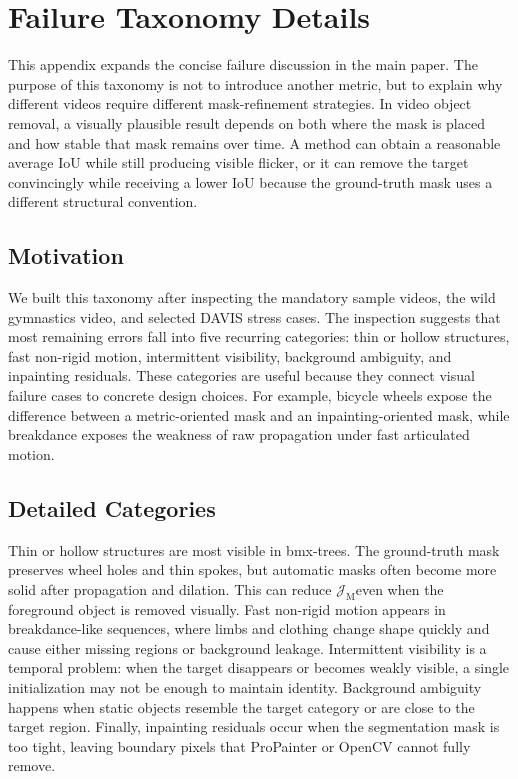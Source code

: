 \documentclass[10pt,twocolumn,letterpaper]{article}
\newcommand{\jm}{\ensuremath{\mathcal{J}_{\mathrm{M}}}}
\begin{document}
\section{Failure Taxonomy Details}
\label{app:failure_taxonomy}
This appendix expands the concise failure discussion in the main paper. The purpose of this taxonomy is not to introduce another metric, but to explain why different videos require different mask-refinement strategies. In video object removal, a visually plausible result depends on both where the mask is placed and how stable that mask remains over time. A method can obtain a reasonable average IoU while still producing visible flicker, or it can remove the target convincingly while receiving a lower IoU because the ground-truth mask uses a different structural convention.

\subsection{Motivation}
We built this taxonomy after inspecting the mandatory sample videos, the wild gymnastics video, and selected DAVIS stress cases. The inspection suggests that most remaining errors fall into five recurring categories: thin or hollow structures, fast non-rigid motion, intermittent visibility, background ambiguity, and inpainting residuals. These categories are useful because they connect visual failure cases to concrete design choices. For example, bicycle wheels expose the difference between a metric-oriented mask and an inpainting-oriented mask, while breakdance exposes the weakness of raw propagation under fast articulated motion.

\subsection{Detailed Categories}
Thin or hollow structures are most visible in bmx-trees. The ground-truth mask preserves wheel holes and thin spokes, but automatic masks often become more solid after propagation and dilation. This can reduce \jm even when the foreground object is removed visually. Fast non-rigid motion appears in breakdance-like sequences, where limbs and clothing change shape quickly and cause either missing regions or background leakage. Intermittent visibility is a temporal problem: when the target disappears or becomes weakly visible, a single initialization may not be enough to maintain identity. Background ambiguity happens when static objects resemble the target category or are close to the target region. Finally, inpainting residuals occur when the segmentation mask is too tight, leaving boundary pixels that ProPainter or OpenCV cannot fully remove.
\end{document}
